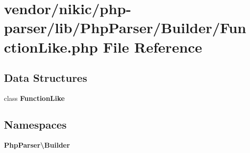 \section{vendor/nikic/php-\/parser/lib/\+Php\+Parser/\+Builder/\+Function\+Like.php File Reference}
\label{_function_like_8php}
\subsection*{Data Structures}
\begin{DoxyCompactItemize}
\item 
class {\bf Function\+Like}
\end{DoxyCompactItemize}
\subsection*{Namespaces}
\begin{DoxyCompactItemize}
\item 
 {\bf Php\+Parser\textbackslash{}\+Builder}
\end{DoxyCompactItemize}
